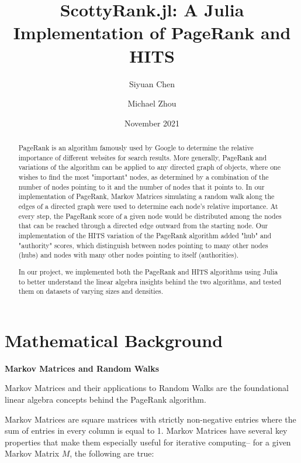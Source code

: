 \documentclass[12pt, titlepage, twoside]{amsart}
\theoremstyle{remark}
\begin{document}
\title[ScottyRank.jl]{ScottyRank.jl: A Julia Implementation of PageRank and HITS}

\author{Siyuan Chen}
\author{Michael Zhou}
\date{November 2021}

\begin{abstract}
PageRank is an algorithm famously used by Google to determine the relative importance of different websites for search results. More generally, PageRank and variations of the algorithm can be applied to any directed graph of objects, where one wishes to find the most "important" nodes, as determined by a combination of the number of nodes pointing to it and the number of nodes that it points to. In our implementation of PageRank, Markov Matrices simulating a random walk along the edges of a directed graph were used to determine each node's relative importance. At every step, the PageRank score of a given node would be distributed among the nodes that can be reached through a directed edge outward from the starting node. Our implementation of the HITS variation of the PageRank algorithm added "hub" and "authority" scores, which distinguish between nodes pointing to many other nodes (hubs) and nodes with many other nodes pointing to itself (authorities).

In our project, we implemented both the PageRank and HITS algorithms using Julia to better understand the linear algebra insights behind the two algorithms, and tested them on datasets of varying sizes and densities.

\end{abstract}

\maketitle


\section{Mathematical Background}

\textbf{Markov Matrices and Random Walks}

Markov Matrices and their applications to Random Walks are the foundational linear algebra concepts behind the PageRank algorithm.

Markov Matrices are square matrices with strictly non-negative entries where the sum of entries in every column is equal to 1. Markov Matrices have several key properties that make them especially useful for iterative computing-- for a given Markov Matrix $M$, the following are true:
\end{document}
